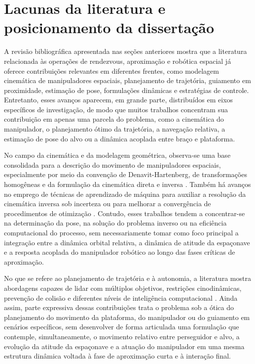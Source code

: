 \section{Lacunas da literatura e posicionamento da dissertação}

A revisão bibliográfica apresentada nas seções anteriores mostra que a literatura relacionada às operações de rendezvous, aproximação e robótica espacial já oferece contribuições relevantes em diferentes frentes, como modelagem cinemática de manipuladores espaciais, planejamento de trajetória, guiamento em proximidade, estimação de pose, formulações dinâmicas e estratégias de controle.
Entretanto, esses avanços aparecem, em grande parte, distribuídos em eixos específicos de investigação, de modo que muitos trabalhos concentram sua contribuição em apenas uma parcela do problema, como a cinemática do manipulador, o planejamento ótimo da trajetória, a navegação relativa, a estimação de pose do alvo ou a dinâmica acoplada entre braço e plataforma.

No campo da cinemática e da modelagem geométrica, observa-se uma base consolidada para a descrição do movimento de manipuladores espaciais, especialmente por meio da convenção de Denavit-Hartenberg, de transformações homogêneas e da formulação da cinemática direta e inversa \cite{fonseca2019kinematics}.
Também há avanços no emprego de técnicas de aprendizado de máquina para auxiliar a resolução da cinemática inversa sob incerteza ou para melhorar a convergência de procedimentos de otimização \cite{santos2022uncertainty,santos2022machine,santos2023physics}. Contudo, esses trabalhos tendem a concentrar-se na determinação da pose, na solução do problema inverso ou na eficiência computacional do processo, sem necessariamente tomar como foco principal a integração entre a dinâmica orbital relativa, a dinâmica de atitude da espaçonave e a resposta acoplada do manipulador robótico ao longo das fases críticas de aproximação.

No que se refere ao planejamento de trajetória e à autonomia, a literatura mostra abordagens capazes de lidar com múltiplos objetivos, restrições cinodinâmicas, prevenção de colisão e diferentes níveis de inteligência computacional \cite{santos2022machine,capolupo2017heuristic,fiori2024modeling}.
Ainda assim, parte expressiva dessas contribuições trata o problema sob a ótica do planejamento do movimento da plataforma, do manipulador ou do guiamento em cenários específicos, sem desenvolver de forma articulada uma formulação que contemple, simultaneamente, o movimento relativo entre perseguidor e alvo, a evolução da atitude da espaçonave e a atuação do manipulador em uma mesma estrutura dinâmica voltada à fase de aproximação curta e à interação final.

